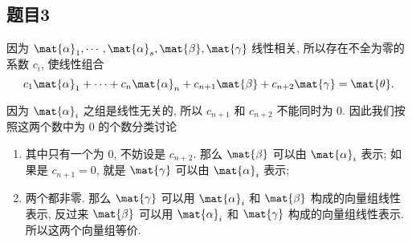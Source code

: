\subsection*{ 题目3 }
\begin{solution}
因为 $\mat{\alpha}_1, \cdots, \mat{\alpha}_s, \mat{\beta}, \mat{\gamma}$ 线性相关, 所以存在不全为零的系数 $c_i$, 使线性组合
\[
c_1 \mat{\alpha}_1 + \cdots + c_n \mat{\alpha}_n + c_{n + 1} \mat{\beta} + c_{n + 2} \mat{\gamma} = \mat{\theta}.
\]

因为 $\mat{\alpha}_i$ 之组是线性无关的, 所以 $c_{n + 1}$ 和 $c_{n + 2}$ 不能同时为 $0$. 因此我们按照这两个数中为 $0$ 的个数分类讨论
\begin{enumerate}
    \item 其中只有一个为 $0$, 不妨设是 $c_{n + 2}$. 那么 $\mat{\beta}$ 可以由 $\mat{\alpha}_i$ 表示; 如果是 $c_{n + 1} = 0$, 就是 $\mat{\gamma}$ 可以由 $\mat{\alpha}_i$ 表示;
    \item 两个都非零. 那么 $\mat{\gamma}$ 可以用 $\mat{\alpha}_i$ 和 $\mat{\beta}$ 构成的向量组线性表示, 反过来 $\mat{\beta}$ 可以用 $\mat{\alpha}_i$ 和 $\mat{\gamma}$ 构成的向量组线性表示. 所以这两个向量组等价.
\end{enumerate}
\end{solution}

